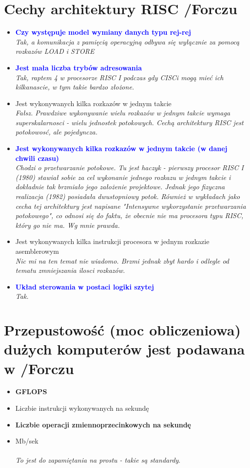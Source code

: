 \section{Cechy architektury RISC {\small /Forczu}}
	\begin{itemize}
    \item \textcolor{Blue}{\textbf{Czy występuje model wymiany danych typu rej-rej}}\\
    {\small \emph{Tak, a komunikacja z pamięcią operacyjną odbywa się wyłącznie za pomocą rozkazów LOAD i STORE}}
    \item \textcolor{Blue}{\textbf{Jest mała liczba trybów adresowania}}\\
    {\small \emph{Tak, raptem 4 w procesorze RISC I podczas gdy CISCi mogą mieć ich kilkanascie, w tym takie bardzo złożone.}}
    \item Jest wykonywanych kilka rozkazów w jednym takcie\\
    {\small \emph{Fałsz. Prawdziwe wykonywanie wielu rozkazów w jednym takcie wymaga superskalarnosci - wielu jednostek potokowych. Cechą architektury RISC jest potokowosć, ale pojedyncza.}}
    \item \textcolor{Blue}{\textbf{Jest wykonywanych kilka rozkazów w jednym takcie (w danej chwili czasu)}}\\
    {\small \emph{Chodzi o przetwarzanie potokowe. Tu jest haczyk - pierwszy procesor RISC I (1980) stawiał sobie za cel wykonanie \emph{jednego rozkazu w jednym takcie} i dokładnie tak brzmiało jego założenie projektowe. Jednak jego fizyczna realizacja (1982) posiadała dwustopniowy potok. Również w wykładach jako cecha tej architektury jest napisane "Intensywne wykorzystanie przetwarzania potokowego", co odnosi się do faktu, że obecnie nie ma procesora typu RISC, który go nie ma. Wg mnie prawda.}}
    \item Jest wykonywanych kilka instrukcji procesora w jednym rozkazie asemblerowym\\
    {\small \emph{Nic mi na ten temat nie wiadomo. Brzmi jednak zbyt hardo i odlegle od tematu zmniejszania ilosci rozkazów.}}
    \item \textcolor{Blue}{\textbf{Układ sterowania w postaci logiki szytej}}\\
    {\small \emph{Tak.}}
    \end{itemize}

\section{Przepustowość (moc obliczeniowa) dużych komputerów jest podawana w {\small /Forczu}}
	\begin{itemize}
    \item \textbf{GFLOPS}
    \item Liczbie instrukcji wykonywanych na sekundę
    \item \textbf{Liczbie operacji zmiennoprzecinkowych na sekundę}
    \item Mb/sek\\\\
    {\small \emph{To jest do zapamiętania na prostu - takie są standardy}}.
    \end{itemize}

